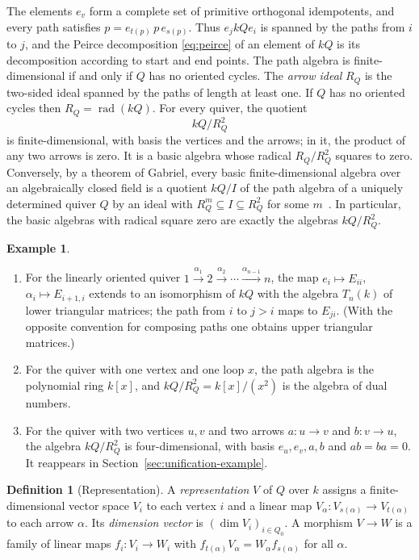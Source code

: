 \documentclass[12pt, a4paper]{report}
\theoremstyle{plain}
\theoremstyle{definition}
\newtheorem{definition}[theorem]{Definition}
\newtheorem{example}[theorem]{Example}
\theoremstyle{remark}
\theoremstyle{plain}
\newcommand{\rad}[0]{\operatorname{rad}} %
\begin{document}
The elements $e_v$ form a complete set of primitive orthogonal idempotents, and every path satisfies $p=e_{t(p)}\,p\,e_{s(p)}$. Thus $e_jkQe_i$ is spanned by the paths from $i$ to $j$, and the Peirce decomposition \eqref{eq:peirce} of an element of $kQ$ is its decomposition according to start and end points. The path algebra is finite-dimensional if and only if $Q$ has no oriented cycles. The \emph{arrow ideal} $R_Q$ is the two-sided ideal spanned by the paths of length at least one. If $Q$ has no oriented cycles then $R_Q=\rad(kQ)$. For every quiver, the quotient
\[ kQ/R_Q^2 \]
is finite-dimensional, with basis the vertices and the arrows; in it, the product of any two arrows is zero. It is a basic algebra whose radical $R_Q/R_Q^2$ squares to zero. Conversely, by a theorem of Gabriel, every basic finite-dimensional algebra over an algebraically closed field is a quotient $kQ/I$ of the path algebra of a uniquely determined quiver $Q$ by an ideal with $R_Q^m\subseteq I\subseteq R_Q^2$ for some $m$~\cite[Theorem~II.3.7]{AssemSimsonSkowronski2006}. In particular, the basic algebras with radical square zero are exactly the algebras $kQ/R_Q^2$.

\begin{example}\label{ex:path-algebras}
\begin{enumerate}
  \item For the linearly oriented quiver $1\xrightarrow{\alpha_1}2\xrightarrow{\alpha_2}\cdots\xrightarrow{\alpha_{n-1}}n$, the map $e_i\mapsto E_{ii}$, $\alpha_i\mapsto E_{i+1,i}$ extends to an isomorphism of $kQ$ with the algebra $T_n(k)$ of lower triangular matrices; the path from $i$ to $j>i$ maps to $E_{ji}$. (With the opposite convention for composing paths one obtains upper triangular matrices.)
  \item For the quiver with one vertex and one loop $x$, the path algebra is the polynomial ring $k[x]$, and $kQ/R_Q^2=k[x]/(x^2)$ is the algebra of dual numbers.
  \item For the quiver with two vertices $u,v$ and two arrows $a:u\to v$ and $b:v\to u$, the algebra $kQ/R_Q^2$ is four-dimensional, with basis $e_u,e_v,a,b$ and $ab=ba=0$. It reappears in Section~\ref{sec:unification-example}.
\end{enumerate}
\end{example}

\begin{definition}[Representation]\label{def:representation}
A \emph{representation} $V$ of $Q$ over $k$ assigns a finite-dimensional vector space $V_i$ to each vertex $i$ and a linear map $V_\alpha:V_{s(\alpha)}\to V_{t(\alpha)}$ to each arrow $\alpha$. Its \emph{dimension vector} is $(\dim V_i)_{i\in Q_0}$. A morphism $V\to W$ is a family of linear maps $f_i:V_i\to W_i$ with $f_{t(\alpha)}V_\alpha=W_\alpha f_{s(\alpha)}$ for all $\alpha$.
\end{definition}
\end{document}
